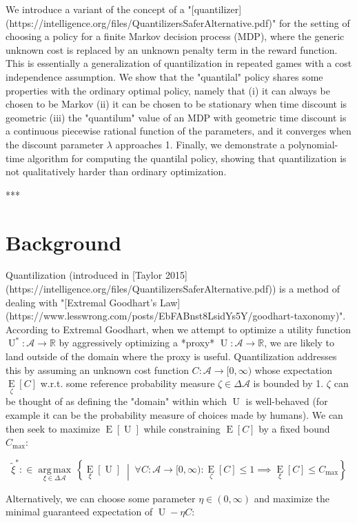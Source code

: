 \documentclass[a4paper]{article}
\newcommand{\AB}[1]{\left[#1\right]}
\newcommand{\ACM}[2]{\left\{#1\;\middle\vert\;#2\right\}}
\newcommand{\Ea}[2]{\underset{#1}{\operatorname{E}}\AB{#2}}
\newcommand{\Argmax}[1]{\underset{#1}{\operatorname{arg\,max}}\,}
\newcommand{\Reals}{\mathbb{R}}
\newcommand{\A}{\mathcal{A}}
\newcommand{\Ut}{\operatorname{U}}
\newcommand{\Co}{C}
\begin{document}
We introduce a variant of the concept of a "[quantilizer](https://intelligence.org/files/QuantilizersSaferAlternative.pdf)" for the setting of choosing a policy for a finite Markov decision process (MDP), where the generic unknown cost is replaced by an unknown penalty term in the reward function. This is essentially a generalization of quantilization in repeated games with a cost independence assumption. We show that the "quantilal" policy shares some properties with the ordinary optimal policy, namely that (i) it can always be chosen to be Markov (ii) it can be chosen to be stationary when time discount is geometric (iii) the "quantilum" value of an MDP with geometric time discount is a continuous piecewise rational function of the parameters, and it converges when the discount parameter $\lambda$ approaches 1. Finally, we demonstrate a polynomial-time algorithm for computing the quantilal policy, showing that quantilization is not qualitatively harder than ordinary optimization.

***

\section{Background}

Quantilization (introduced in [Taylor 2015](https://intelligence.org/files/QuantilizersSaferAlternative.pdf)) is a method of dealing with "[Extremal Goodhart's Law](https://www.lesswrong.com/posts/EbFABnst8LsidYs5Y/goodhart-taxonomy)". According to Extremal Goodhart, when we attempt to optimize a utility function $\Ut^*: \A \rightarrow \Reals$ by aggressively optimizing a *proxy* $\Ut: \A \rightarrow \Reals$, we are likely to land outside of the domain where the proxy is useful. Quantilization addresses this by assuming an unknown cost function $\Co: \A \rightarrow [0,\infty)$ whose expectation $\Ea{\zeta}{\Co}$ w.r.t. some reference probability measure $\zeta \in \Delta\A$ is bounded by 1. $\zeta$ can be thought of as defining the "domain" within which $\Ut$ is well-behaved (for example it can be the probability measure of choices made by humans). We can then seek to maximize $\Ea{}{\Ut}$ while constraining $\Ea{}{\Co}$ by a fixed bound $C_{\max}$:

$$\tilde{\xi}^* :\in \Argmax{\xi \in \Delta\A}\ACM{\Ea{\xi}{\Ut}}{\forall \Co: \A \rightarrow [0,\infty): \Ea{\zeta}{\Co} \leq 1 \implies \Ea{\xi}{\Co} \leq C_{\max}}$$

Alternatively, we can choose some parameter $\eta\in(0,\infty)$ and maximize the minimal guaranteed expectation of $\Ut-\eta \Co$:
\end{document}
